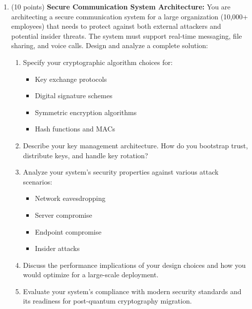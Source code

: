\documentclass[10pt,a4paper,american]{exam}
\begin{document}
\begin{enumerate}
	\item (10 points) \textbf{Secure Communication System Architecture:}
	      You are architecting a secure communication system for a large organization (10,000+ employees) that needs to protect against both external attackers and potential insider threats. The system must support real-time messaging, file sharing, and voice calls.
	      Design and analyze a complete solution:
	      \begin{enumerate}
		      \item Specify your cryptographic algorithm choices for:
		            \begin{itemize}
			            \item Key exchange protocols
			            \item Digital signature schemes
			            \item Symmetric encryption algorithms
			            \item Hash functions and MACs
		            \end{itemize}
		      \item Describe your key management architecture. How do you bootstrap trust, distribute keys, and handle key rotation?
		      \item Analyze your system's security properties against various attack scenarios:
		            \begin{itemize}
			            \item Network eavesdropping
			            \item Server compromise
			            \item Endpoint compromise
			            \item Insider attacks
		            \end{itemize}
		      \item Discuss the performance implications of your design choices and how you would optimize for a large-scale deployment.
		      \item Evaluate your system's compliance with modern security standards and its readiness for post-quantum cryptography migration.
	      \end{enumerate}
\end{enumerate}
\end{document}
